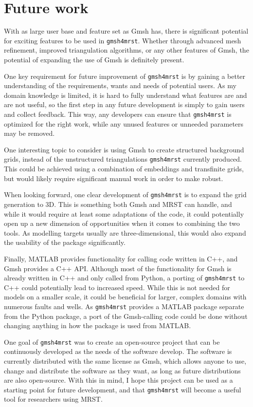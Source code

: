 \section{Future work}
\label{sec:Future}
With as large user base and feature set as Gmsh has, there is significant potential for exciting features to be used in \verb|gmsh4mrst|. Whether through advanced mesh refinement, improved triangulation algorithms, or any other features of Gmsh, the potential of expanding the use of Gmsh is definitely present.

One key requirement for future improvement of \verb|gmsh4mrst| is by gaining a better understanding of the requirements, wants and needs of potential users. As my domain knowledge is limited, it is hard to fully understand what features are and are not useful, so the first step in any future development is simply to gain users and collect feedback. This way, any developers can ensure that \verb|gmsh4mrst| is optimized for the right work, while any unused features or unneeded parameters may be removed.

One interesting topic to consider is using Gmsh to create structured background grids, instead of the unstructured triangulations \verb|gmsh4mrst| currently produced. This could be achieved using a combination of embeddings and transfinite grids, but would likely require significant manual work in order to make robust.

When looking forward, one clear development of \verb|gmsh4mrst| is to expand the grid generation to 3D. This is something both Gmsh and MRST can handle, and while it would require at least some adaptations of the code, it could potentially open up a new dimension of opportunities when it comes to combining the two tools. As modelling targets usually are three-dimensional, this would also expand the usability of the package significantly.

Finally, MATLAB provides functionality for calling code written in C++, and Gmsh provides a C++ API. Although most of the functionality for Gmsh is already written in C++ and only called from Python, a porting of \verb|gmsh4mrst| to C++ could potentially lead to increased speed. While this is not needed for models on a smaller scale, it could be beneficial for larger, complex domains with numerous faults and wells. As \verb|gmsh4mrst| provides a MATLAB package separate from the Python package, a port of the Gmsh-calling code could be done without changing anything in how the package is used from MATLAB.

One goal of \verb|gmsh4mrst| was to create an open-source project that can be continuously developed as the needs of the software develop. The software is currently distributed with the same license as Gmsh, which allows anyone to use, change and distribute the software as they want, as long as future distributions are also open-source. With this in mind, I hope this project can be used as a starting point for future development, and that \verb|gmsh4mrst| will become a useful tool for researchers using MRST.
